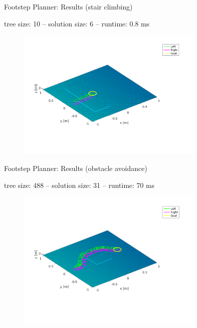 \documentclass[10pt]{beamer}
\begin{document}
\begin{frame}{Footstep Planner: Results (stair climbing)}
  \begin{center}
    tree size: 10 -- solution size: 6 -- runtime: 0.8 ms
  \end{center}
	\begin{figure}
		\centering
		\includegraphics[width=0.8\textwidth]
				{figures/experiments/simple-stairs/footstep-plan.pdf}
	\end{figure}
\end{frame}

\begin{frame}{Footstep Planner: Results (obstacle avoidance)}
  \begin{center}
    tree size: 488 -- solution size: 31 -- runtime: 70 ms
  \end{center}
	\begin{figure}
		\centering
		\includegraphics[width=0.8\textwidth]
				{figures/experiments/obstacle-avoidance/footstep-plan.pdf}
	\end{figure}
\end{frame}
\end{document}
